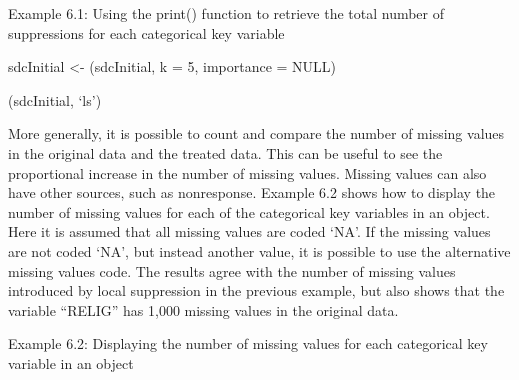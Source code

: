 \documentclass[letterpaper,10pt,english]{sphinxmanual}
\begin{document}
Example 6.1: Using the print() function to retrieve the total number of
suppressions for each categorical key variable

sdcInitial \textless{}- (sdcInitial, k = 5, importance =
NULL)

(sdcInitial, ‘ls’)

\begin{DUlineblock}{0em}
\item[] 
\item[] 
\item[] 
\item[] 
\item[] 
\item[] 
\item[] \sphinxcode{\sphinxupquote{\#\# -{-}-{-}-{-}-{-}-{-}-{-}-{-}-{-}-{-}-{-}-{-}-{-}-{-}-{-}-{-}-{-}-{-}-{-}-{-}-{-}-{-}-{-}-{-}-{-}-{-}-{-}-{-}-{-}-{-}-{-}-{-}-{-}-{-}-{-}-{-}-{-}-{-}-}}
\end{DUlineblock}

More generally, it is possible to count and compare the number of
missing values in the original data and the treated data. This can be
useful to see the proportional increase in the number of missing values.
Missing values can also have other sources, such as nonresponse. Example
6.2 shows how to display the number of missing values for each of the
categorical key variables in an  object. Here it is assumed
that all missing values are coded ‘NA’. If the missing values are not
coded ‘NA’, but instead another value, it is possible to use the
alternative missing values code. The results agree with the number of
missing values introduced by local suppression in the previous example,
but also shows that the variable “RELIG” has 1,000 missing values in the
original data.

Example 6.2: Displaying the number of missing values for each
categorical key variable in an  object
\end{document}
